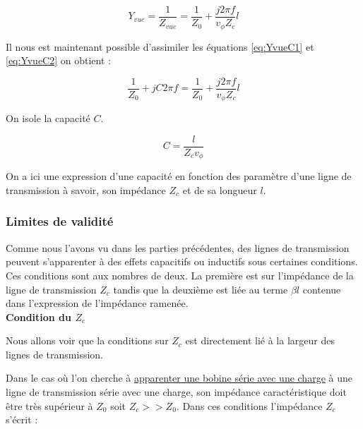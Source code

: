\documentclass[french]{article}
\begin{document}
\begin{equation}
	Y_{vue} = \frac{1}{Z_{vue}} = \frac{1}{Z_0} + \frac{j 2\pi f}{v_\phi Z_c} l
	\label{eq:YvueC2}
\end{equation}

Il nous est maintenant possible d'assimiler les équations \ref{eq:YvueC1} et \ref{eq:YvueC2} on obtient :

\begin{equation}
	\frac{1}{Z_0} + j C 2 \pi f = \frac{1}{Z_0} + \frac{j 2\pi f}{v_\phi Z_c} l
\end{equation}

On isole la capacité $C$.

\begin{equation}
	C = \frac{l}{Z_c v_\phi}
	\label{eq:resultat_C}
\end{equation}

On a ici une expression d'une capacité en fonction des paramètre d'une ligne de transmission à savoir, son impédance $Z_c$ et de sa longueur $l$. 


\subsubsection{Limites de validité}

Comme nous l'avons vu dans les parties précédentes, des lignes de transmission peuvent s'apparenter à des effets capacitifs ou inductifs sous certaines conditions. Ces conditions sont aux nombres de deux. La première est sur l'impédance de la ligne de transmission $Z_c$ tandis que la deuxième est liée au terme $\beta l$ contenue dans l'expression de l'impédance ramenée.\\

\textbf{Condition du $Z_c$\\}

Nous allons voir que la conditions sur $Z_c$ est directement lié à la largeur des lignes de transmission.

Dans le cas où l'on cherche à \underline{apparenter une bobine série avec une charge} à une ligne de transmission série avec une charge, son impédance caractéristique doit être très supérieur à $Z_0$ soit $Z_c >> Z_0$. Dans ces conditions l'impédance $Z_c$ s'écrit :
\end{document}

